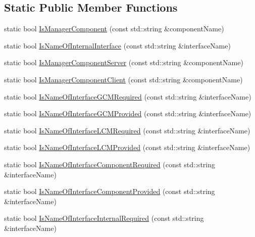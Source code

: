 \subsection*{Static Public Member Functions}
\begin{DoxyCompactItemize}
\item 
static bool \hyperlink{classmts_manager_component_base_a2b81d05712eee16325eb12b92caefef7}{Is\-Manager\-Component} (const std\-::string \&component\-Name)
\item 
static bool \hyperlink{classmts_manager_component_base_ac51eb56e9120d968f1b3df87df1a2298}{Is\-Name\-Of\-Internal\-Interface} (const std\-::string \&interface\-Name)
\item 
static bool \hyperlink{classmts_manager_component_base_afa7148c79d92b99d7144a07c3a1e88ec}{Is\-Manager\-Component\-Server} (const std\-::string \&component\-Name)
\item 
static bool \hyperlink{classmts_manager_component_base_aac57d1d2f4ec563af9c8aaf99bc41b9f}{Is\-Manager\-Component\-Client} (const std\-::string \&component\-Name)
\item 
static bool \hyperlink{classmts_manager_component_base_ae09aa81c2df6d77b4c8ad648d6c9511e}{Is\-Name\-Of\-Interface\-G\-C\-M\-Required} (const std\-::string \&interface\-Name)
\item 
static bool \hyperlink{classmts_manager_component_base_a0430ee1fecc934e7471f30a05fd155d2}{Is\-Name\-Of\-Interface\-G\-C\-M\-Provided} (const std\-::string \&interface\-Name)
\item 
static bool \hyperlink{classmts_manager_component_base_aa6932925d53be7d712e6e8b3bea648bd}{Is\-Name\-Of\-Interface\-L\-C\-M\-Required} (const std\-::string \&interface\-Name)
\item 
static bool \hyperlink{classmts_manager_component_base_a2ab19337dd1251b4d85e50533f5712b7}{Is\-Name\-Of\-Interface\-L\-C\-M\-Provided} (const std\-::string \&interface\-Name)
\item 
static bool \hyperlink{classmts_manager_component_base_a0c23070ddde13927e97af42194248285}{Is\-Name\-Of\-Interface\-Component\-Required} (const std\-::string \&interface\-Name)
\item 
static bool \hyperlink{classmts_manager_component_base_ab927635380aff3ba6bbc2f9ac0232862}{Is\-Name\-Of\-Interface\-Component\-Provided} (const std\-::string \&interface\-Name)
\item 
static bool \hyperlink{classmts_manager_component_base_a264b0eaa7cba44ec821bc909df58b8ba}{Is\-Name\-Of\-Interface\-Internal\-Required} (const std\-::string \&interface\-Name)

\end{DoxyCompactItemize}
